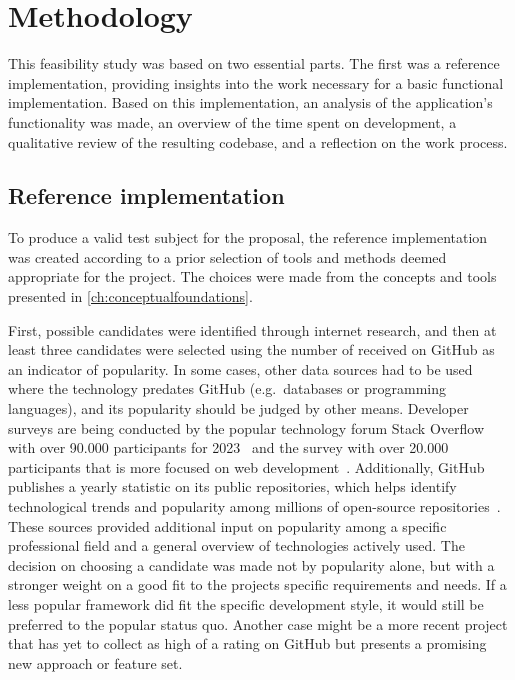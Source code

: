 \chapter{Methodology}
\label{ch:methodology}

This feasibility study was based on two essential parts.
The first was a reference implementation, providing insights into the work necessary for a basic functional implementation.
Based on this implementation, an analysis of the application's functionality was made, an overview of the time spent on development, a qualitative review of the resulting codebase, and a reflection on the work process.

\section{Reference implementation}
\label{sec:reference-implementation}

To produce a valid test subject for the proposal, the reference implementation was created according to a prior selection of tools and methods deemed appropriate for the project.
The choices were made from the concepts and tools presented in \autoref{ch:conceptualfoundations}.

First, possible candidates were identified through internet research, and then at least three candidates were selected using the number of  received on GitHub as an indicator of popularity.
In some cases, other data sources had to be used where the technology predates GitHub (e.g.\ databases or programming languages), and its popularity should be judged by other means.
Developer surveys are being conducted by the popular technology forum Stack Overflow with over 90.000 participants for 2023~\parencite{stackOverflowPoll} and the  survey with over 20.000 participants that is more focused on web development~\parencite{stateOfJSSurvey}.
Additionally, GitHub publishes a yearly statistic on its public repositories, which helps identify technological trends and popularity among millions of open-source repositories~\parencite{stateOfTheOctoverse23}.
These sources provided additional input on popularity among a specific professional field and a general overview of technologies actively used.
The decision on choosing a candidate was made not by popularity alone, but with a stronger weight on a good fit to the project\textquotesingle s specific requirements and needs.
If a less popular framework did fit the specific development style, it would still be preferred to the popular status quo.
Another case might be a more recent project that has yet to collect as high of a rating on GitHub but presents a promising new approach or feature set.

